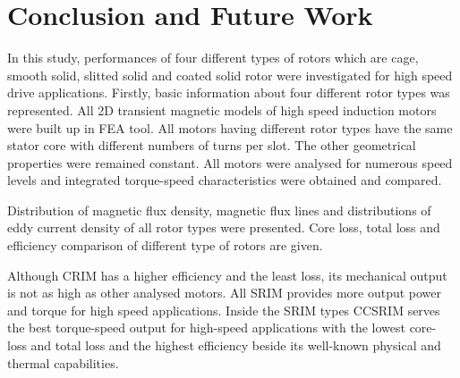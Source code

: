
\chapter{Conclusion and Future Work}
\label{chap:Conclusion-and-Future-Work}

In this study, performances of four different types of rotors which are cage, smooth solid,
slitted solid and coated solid rotor were investigated for high speed drive applications.
Firstly, basic information about four different rotor types was represented. All 2D transient
magnetic models of high speed induction motors were built up in FEA tool. All motors having
different rotor types have the same stator core with different numbers of turns per slot. The
other geometrical properties were remained constant. All motors were analysed for numerous
speed levels and integrated torque-speed characteristics were obtained and compared.

Distribution of magnetic flux density, magnetic flux lines and distributions of eddy current
density of all rotor types were presented. Core loss, total loss and efficiency comparison of
different type of rotors are given.

Although CRIM has a higher efficiency and the least loss, its mechanical output is not as high
as other analysed motors. All SRIM provides more output power and torque for high speed
applications. Inside the SRIM types CCSRIM serves the best torque-speed output for high-speed
applications with the lowest core- loss and total loss and the highest efficiency beside its
well-known physical and thermal capabilities.
